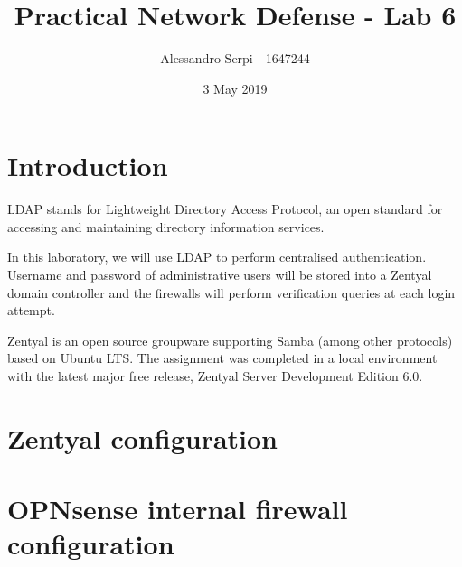 \documentclass[draft]{homework}
\title{Practical Network Defense - Lab 6}
\author{Alessandro Serpi - 1647244}
\date{3 May 2019}
\newcommand{\opn}{OPNsense\xspace}
\begin{document}
    \maketitle
    \tableofcontents
    
    
    \pagebreak
    \section{Introduction}
    LDAP stands for Lightweight Directory Access Protocol, an open standard for accessing and maintaining directory information services.
    
    In this laboratory, we will use LDAP to perform centralised authentication.
    Username and password of administrative users will be stored into a Zentyal domain controller and the firewalls will perform verification queries at each login attempt.
    
    Zentyal is an open source groupware supporting Samba (among other protocols) based on Ubuntu LTS.
    The assignment was completed in a local environment with the  latest major free release, Zentyal Server Development Edition 6.0.
    
    
    \section{Zentyal configuration}
    
    
    \section{\opn internal firewall configuration}
\end{document}
